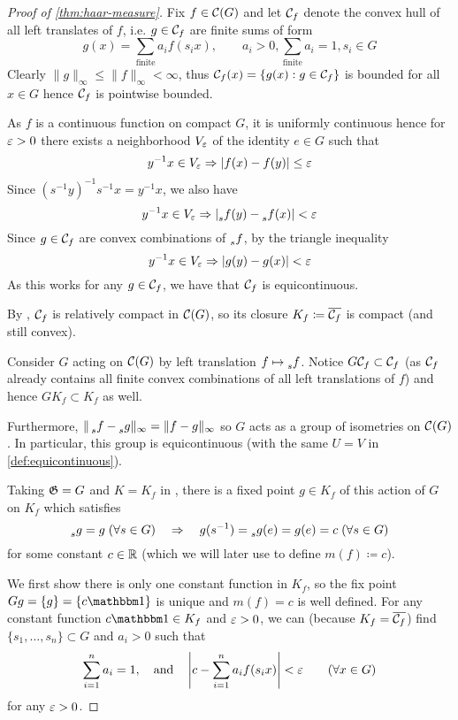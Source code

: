 \begin{proof}[Proof of \cref{thm:haar-measure}]
  Fix $f \in \mathcal{C}(G)$ and let $\mathcal{C}_f$ denote the convex hull of all left
  translates of $f$, i.e. $g \in \mathcal{C}_f$ are finite sums of form
  \[
    g(x) = \sum_{\mathrm{finite}} a_i f(s_i x), \qquad a_i > 0, \sum_{\mathrm{finite}} a_i = 1, s_i \in G
  \]
  Clearly $\|g\|_\infty \leq \|f\|_\infty < \infty$, thus $\mathcal{C}_f(x) = \{g(x) : g \in
  \mathcal{C}_f\}$ is bounded for all $x \in G$ hence $\mathcal{C}_f$ is pointwise bounded.

  As $f$ is a continuous function on compact $G$, it is uniformly continuous
  hence for $\varepsilon > 0$ there exists a neighborhood $V_\varepsilon$ of the identity
  $e \in G$ such that
  \[
    y^{-1} x \in V_\varepsilon \Rightarrow \lvert f(x) - f(y) \rvert \leq \varepsilon
  \]
  Since $(s^{-1} y)^{-1} s^{-1} x = y^{-1} x$, we also have
  \[
    y^{-1} x \in V_\varepsilon \Rightarrow \lvert \prescript{}{s}{f}(y) - \prescript{}{s}f(x) \rvert < \varepsilon
  \]
  Since $g \in \mathcal{C}_f$ are convex combinations of $\prescript{}{s}{f}$,
  by the triangle inequality
  \[
    y^{-1} x \in V_\varepsilon \Rightarrow \lvert g(y) - g(x) \rvert < \varepsilon
  \]
  As this works for any $g \in \mathcal{C}_f$, we have that $\mathcal{C}_f$ is equicontinuous.

  By , $\mathcal{C}_f$ is relatively compact in $\mathcal{C}(G)$,
  so its closure $K_f \coloneqq \overline{\mathcal{C}_f}$ is compact (and still convex).

  Consider $G$ acting on $\mathcal{C}(G)$ by left translation $f \mapsto
  \prescript{}{s}{f}$. Notice $G \mathcal{C}_f \subset \mathcal{C}_f$ (as $\mathcal{C}_f$ already
  contains all finite convex combinations of all left translations of $f$) and
  hence $G K_f \subset K_f$ as well.

  Furthermore,
  $\|\prescript{}{s}{f} - \prescript{}{s}{g}\|_\infty = \|f - g\|_\infty$
  so $G$ acts as a group of isometries on $\mathcal{C}(G)$.
  In particular, this group is equicontinuous (with the same $U = V$
  in \cref{def:equicontinuous}).

  Taking $\mathfrak{G} = G$ and $K = K_f$ in , there is a fixed
  point $g \in K_f$ of this action of $G$ on $K_f$ which satisfies
  \[
    \prescript{}{s}{g} = g \; (\forall s \in G)
    \quad\Rightarrow\quad
    g(s^{-1}) = \prescript{}{s}g(e) = g(e) = c\; (\forall s \in G)
  \]
  for some constant $c \in \mathbb{R}$ (which we will later use to
  define $m(f) \coloneqq c$).

  We first show there is only one constant function in $K_f$, so the fix
  point $G g = \{g\} = \{c \ind\}$ is unique and $m(f) = c$ is well defined.
  For any constant function $c \ind \in K_f$ and $\varepsilon > 0$, we can
  (because $K_f = \overline{\mathcal{C}_f}$) find $\{s_1, \ldots, s_n\} \subset G$
  and $a_i > 0$ such that
  \begin{align}
    \label{eq:combo-close-to-constant}
    \sum_{i=1}^n a_i = 1,
    \quad \text{and}\quad \left\lvert c - \sum_{i=1}^n a_i f(s_i x) \right\rvert < \varepsilon
    \qquad (\forall x \in G)
  \end{align}
  for any $\varepsilon > 0$.


\end{proof}
